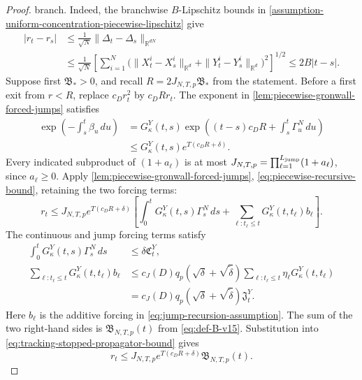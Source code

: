 \begin{proof}
branch. Indeed, the branchwise $B$-Lipschitz bounds in
\cref{assumption-uniform-concentration-piecewise-lipschitz} give
\[
\begin{aligned}
 |r_t-r_s|
 &\le\frac1{\sqrt N}\|\Delta_t-\Delta_s\|_{\mathbb R^{dN}}\\
 &\le\frac1{\sqrt N}
       \left[\sum_{i=1}^N
       \bigl(\|X_t^i-X_s^i\|_{\mathbb R^d}
             +\|Y_t^i-Y_s^i\|_{\mathbb R^d}\bigr)^2\right]^{1/2}
 \le2B|t-s|.
\end{aligned}
\]
Suppose first $\mathfrak B_*>0$, and recall
$R=2J_{N,T,p}\mathfrak B_*$ from the statement. Before a first exit from
$r<R$, replace $c_Dr_t^2$ by $c_DRr_t$.
The exponent in \cref{lem:piecewise-gronwall-forced-jumps} satisfies
\[
\begin{aligned}
 \exp\left(-\int_s^t\beta_u\,du\right)
 &=G_\kappa^Y(t,s)
       \exp\left((t-s)c_DR+\int_s^t\Gamma_u^N\,du\right)\\
 &\le G_\kappa^Y(t,s)e^{T(c_DR+\delta)}.
\end{aligned}
\]
Every indicated subproduct of $(1+a_\ell)$ is at most
$J_{N,T,p}=\prod_{\ell=1}^{L_{\mathrm{jump}}}(1+a_\ell)$, since $a_\ell\ge0$.
Apply \cref{lem:piecewise-gronwall-forced-jumps},
\eqref{eq:piecewise-recursive-bound}, retaining the two forcing terms:
\begin{equation}
\label{eq:tracking-stopped-propagator-bound}
 r_t\le J_{N,T,p}e^{T(c_DR+\delta)}
 \left[\int_0^tG_\kappa^Y(t,s)\Gamma_s^N\,ds
       +\sum_{\ell:t_\ell\le t}G_\kappa^Y(t,t_\ell)b_\ell\right].
\end{equation}
The continuous and jump forcing terms satisfy
\[
\begin{aligned}
 \int_0^tG_\kappa^Y(t,s)\Gamma_s^N\,ds
 &\le\delta\mathfrak C_t^Y,\\
 \sum_{\ell:t_\ell\le t}G_\kappa^Y(t,t_\ell)b_\ell
 &\le c_J(D)q_p(\sqrt\delta+\sqrt{\widetilde\delta})
                \sum_{\ell:t_\ell\le t}\eta_\ell G_\kappa^Y(t,t_\ell)\\
 &=c_J(D)q_p(\sqrt\delta+\sqrt{\widetilde\delta})\mathfrak J_t^Y.
\end{aligned}
\]
Here $b_\ell$ is the additive forcing in
\eqref{eq:jump-recursion-assumption}. The sum of the two right-hand sides is
$\mathfrak B_{N,T,p}(t)$ from \eqref{eq:def-B-v15}. Substitution into
\eqref{eq:tracking-stopped-propagator-bound} gives
\begin{equation}
\label{eq:tracking-forcing-envelope-bound}
 r_t\le J_{N,T,p}e^{T(c_DR+\delta)}\mathfrak B_{N,T,p}(t).
\end{equation}


\end{proof}
